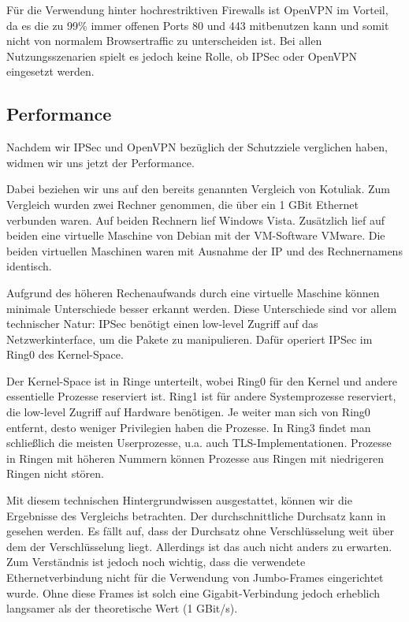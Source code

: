\documentclass[12pt]{scrartcl}
\begin{document}
Für die Verwendung hinter hochrestriktiven Firewalls ist OpenVPN im Vorteil, da es die zu 99\% immer offenen Ports 80 und 443 mitbenutzen kann und somit nicht von normalem Browsertraffic zu unterscheiden ist. Bei allen Nutzungsszenarien spielt es jedoch keine Rolle, ob IPSec oder OpenVPN eingesetzt werden.

\subsection{Performance}
Nachdem wir IPSec und OpenVPN bezüglich der Schutzziele verglichen haben, widmen wir uns jetzt der Performance.

Dabei beziehen wir uns auf den bereits genannten Vergleich von Kotuliak\cite{Kotuliak2011}. Zum Vergleich wurden zwei Rechner genommen, die über ein 1 GBit Ethernet verbunden waren. Auf beiden Rechnern lief Windows Vista. Zusätzlich lief auf beiden eine virtuelle Maschine von Debian mit der VM-Software VMware. Die beiden virtuellen Maschinen waren mit Ausnahme der IP und des Rechnernamens identisch.

Aufgrund des höheren Rechenaufwands durch eine virtuelle Maschine können minimale Unterschiede besser erkannt werden. Diese Unterschiede sind vor allem technischer Natur: IPSec benötigt einen low-level Zugriff auf das Netzwerkinterface, um die Pakete zu manipulieren. Dafür operiert IPSec im Ring0 des Kernel-Space.\cite{Kotuliak2011}

Der Kernel-Space ist in Ringe unterteilt, wobei Ring0 für den Kernel und andere essentielle Prozesse reserviert ist. Ring1 ist für andere Systemprozesse reserviert, die low-level Zugriff auf Hardware benötigen. Je weiter man sich von Ring0 entfernt, desto weniger Privilegien haben die Prozesse. In Ring3 findet man schließlich die meisten Userprozesse, u.a. auch TLS-Implementationen. Prozesse in Ringen mit höheren Nummern können Prozesse aus Ringen mit niedrigeren Ringen nicht stören.\cite{Kotuliak2011}

Mit diesem technischen Hintergrundwissen ausgestattet, können wir die Ergebnisse des Vergleichs betrachten. Der durchschnittliche Durchsatz kann in  gesehen werden. Es fällt auf, dass der Durchsatz ohne Verschlüsselung weit über dem der Verschlüsselung liegt. Allerdings ist das auch nicht anders zu erwarten. Zum Verständnis ist jedoch noch wichtig, dass die verwendete Ethernetverbindung nicht für die Verwendung von Jumbo-Frames eingerichtet wurde. Ohne diese Frames ist solch eine Gigabit-Verbindung jedoch erheblich langsamer als der theoretische Wert (1 GBit/s).\cite{Kotuliak2011}
\end{document}
